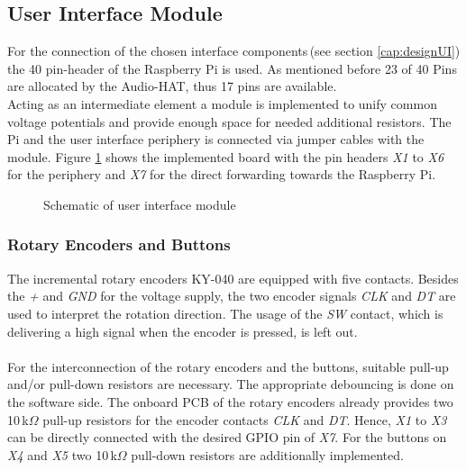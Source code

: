 \subsection{User Interface Module}\label{cap:hardwareUI}

For the connection of the chosen interface components\,(see section \ref{cap:designUI}) the 40 pin-header of the Raspberry Pi is used. As mentioned before 23 of 40 Pins are allocated by the Audio-HAT, thus 17 pins are available.\\
Acting as an intermediate element a module is implemented to unify common voltage potentials and provide enough space for needed additional resistors.
The Pi and the user interface periphery is connected via jumper cables with the module.
Figure \ref{fig:UI_schematic} shows the implemented board with the pin headers \textit{X1} to \textit{X6} for the periphery and \textit{X7} for the direct forwarding towards the Raspberry Pi.

\begin{figure}[H]
\centering 
	\caption[UI_schematic]{Schematic of user interface module}
	\label{fig:UI_schematic}
	
\end{figure}

\subsubsection{Rotary Encoders and Buttons}

The incremental rotary encoders KY-040 are equipped with five contacts. Besides the \textit{+} and \textit{GND} for the voltage supply, the two encoder signals \textit{CLK} and \textit{DT} are used to interpret the rotation direction.
The usage of the \textit{SW} contact, which is delivering a high signal when the encoder is pressed, is left out.\\
\\
For the interconnection of the rotary encoders and the buttons, suitable pull-up and/or pull-down resistors are
necessary. The appropriate debouncing is done on the software side.
The onboard PCB of the rotary encoders already provides two 10\,k$\Omega$ pull-up resistors for the encoder contacts \textit{CLK} and \textit{DT}.
Hence, \textit{X1} to \textit{X3} can be directly connected with the desired GPIO pin of \textit{X7}.
For the buttons on \textit{X4} and \textit{X5} two 10\,k$\Omega$ pull-down resistors are additionally implemented.

